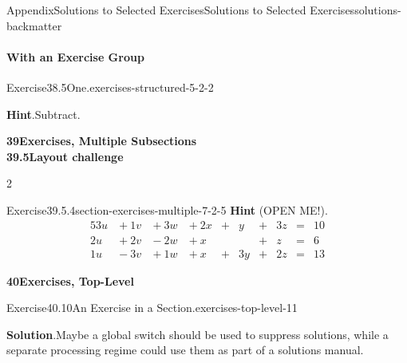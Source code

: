 \documentclass[twoside,10pt,]{article}
\newcommand{\blocktitlefont}{\relax}
\numberwithin{equation}{section}
\newcommand{\amp}{&}
\begin{document}
\begin{solutions-section}{Appendix}{Solutions to Selected Exercises}{}{Solutions to Selected Exercises}{}{}{solutions-backmatter}
\paragraph[{With an Exercise Group}]{With an Exercise Group}
\begin{exercisegroup}
\begin{divisionsolutioneg}{Exercise}{38.5}{One.}{exercises-structured-5-2-2}%
\par\smallskip%
\noindent\textbf{\blocktitlefont Hint}.\hypertarget{exercises-structured-5-2-2-3-back}{}\quad{}Subtract.%
\end{divisionsolutioneg}%
\end{exercisegroup}
\par\medskip\noindent
\par\medskip\noindent
\par\medskip
\noindent\textbf{\large{}39\space\textperiodcentered\space{}Exercises, Multiple Subsections\\
39.5\space\textperiodcentered\space{}Layout challenge}
\begin{exercisegroupcol}{2}
\begin{divisionsolutionegcol}{Exercise}{39.5.4}{}{section-exercises-multiple-7-2-5}%
\noindent\textbf{\blocktitlefont Hint} (OPEN ME!).\hypertarget{section-exercises-multiple-7-2-5-2-back}{}\quad{}%
\begin{alignat*}{5}
3u \amp {}+{} 1v \amp {}+{} 3w \amp {}+{} 2x \amp {}+{} \amp  y \amp {}+{} \amp 3z \amp {}={} \amp 10\\
2u \amp {}+{} 2v \amp {}-{} 2w \amp {}+{} x  \amp       \amp    \amp {}+{} \amp  z \amp {}={} \amp 6\\
1u \amp {}-{} 3v \amp {}+{} 1w \amp {}+{} x  \amp {}+{} \amp 3y \amp {}+{} \amp 2z \amp {}={} \amp 13
\end{alignat*}
\end{divisionsolutionegcol}%
\end{exercisegroupcol}
\par\medskip\noindent
\par\medskip
\noindent\textbf{\large{}40\space\textperiodcentered\space{}Exercises, Top-Level}
\begin{divisionsolution}{Exercise}{40.10}{An Exercise in a Section.}{exercises-top-level-11}%
\par\smallskip%
\noindent\textbf{\blocktitlefont Solution}.\hypertarget{exercises-top-level-11-3-back}{}\quad{}Maybe a global switch should be used to suppress solutions, while a separate processing regime could use them as part of a solutions manual.%

\end{divisionsolution}
\end{solutions-section}
\end{document}
